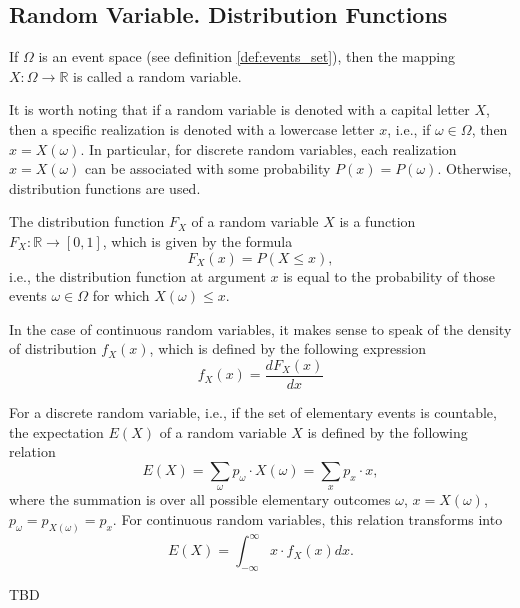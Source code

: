 \subsection{Random Variable. Distribution Functions}

\begin{definition}
\label{def:random_variable}
If $\Omega$ is an event space (see definition \autoref{def:events_set}), then the mapping $X: \Omega \to \mathbb{R}$ is called a random variable.
\end{definition}

It is worth noting that if a random variable is denoted with a capital letter $X$, then a specific realization is denoted with a lowercase letter $x$, i.e., if $\omega \in \Omega$, then $x = X(\omega)$. In particular, for discrete random variables, each realization $x = X(\omega)$ can be associated with some probability $P\left(x\right) = P\left(\omega\right)$. Otherwise, distribution functions are used.

\begin{definition}
The distribution function $F_X$ of a random variable $X$ is a function $F_X : \mathbb{R} \to [0,1]$, which is given by the formula
\[
F_X \left(x\right) = P\left(X \le x\right),
\]
i.e., the distribution function at argument $x$ is equal to the probability of those events $\omega \in \Omega$ for which $X(\omega) \le x$.
\end{definition}

\begin{definition}
In the case of continuous random variables, it makes sense to speak of the density of distribution $f_X\left(x\right)$, which is defined by the following expression
\[
f_X\left(x\right) = 
\frac{d F_X\left(x\right)}{d x}
\]
\end{definition}

\begin{definition}
For a discrete random variable, i.e., if the set of elementary events is countable, the expectation $E\left(X\right)$ of a random variable $X$ is defined by the following relation
\[
E\left(X\right) = \sum_\omega p_\omega \cdot X(\omega) = 
\sum_x p_x \cdot x,
\]
where the summation is over all possible elementary outcomes $\omega$, $x = X(\omega)$, $p_\omega = p_{X(\omega)} = p_x$. For continuous random variables, this relation transforms into
\[
E\left(X\right) = \int_{-\infty}^\infty x \cdot f_X\left(x\right) dx.
\]
\end{definition}

TBD